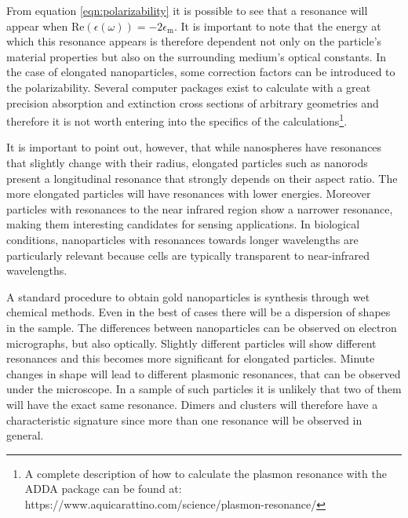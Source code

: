 From equation \ref{eqn:polarizability} it is possible to see that a resonance
will appear when ${\textrm{Re}(\epsilon(\omega)) = -2\epsilon_\textrm{m}}$. It
is important to note that the energy at which this resonance appears is therefore
dependent not only on the particle's material properties but also on the
surrounding medium's optical constants. In the case of elongated nanoparticles,
some correction factors can be introduced to the polarizability. Several
computer packages\cite{Yurkin2011,oskooi2010meep,Draine1994a} exist to
calculate with a great precision absorption and extinction cross sections of
arbitrary geometries and therefore it is not worth entering into the specifics
of the calculations\footnote{A complete description of how to calculate the
plasmon resonance with the ADDA package can be found at:\newline
https://www.aquicarattino.com/science/plasmon-resonance/}.

\begin{sloppypar}
It is important to point out, however, that while nanospheres have resonances
that slightly change with their radius, elongated particles such as nanorods
present a longitudinal resonance that strongly depends on their aspect ratio.
The more elongated particles will have resonances with lower energies. Moreover
particles with resonances to the near infrared region show a narrower
resonance\cite{Sonnichsen2002}, making them interesting candidates for sensing
applications. In biological conditions, nanoparticles with resonances towards
longer wavelengths are particularly relevant because cells are typically
transparent to near-infrared wavelengths.
\end{sloppypar}

\begin{sloppypar}
A standard procedure to obtain gold nanoparticles is synthesis through wet
chemical methods\cite{Vigderman2012}. Even in the best of cases there will be a
dispersion of shapes in the sample. The differences between nanoparticles can be
observed on electron micrographs, but also optically. Slightly
different particles will show different resonances\cite{Lindfors2004} and this
becomes more significant for elongated particles. Minute changes
in shape will lead to different plasmonic resonances, that can be observed under
the microscope. In a sample of such particles it is unlikely that two of them will
have the exact same resonance. Dimers and clusters will therefore have a
characteristic signature since more than one resonance will be observed in
general.
\end{sloppypar}

